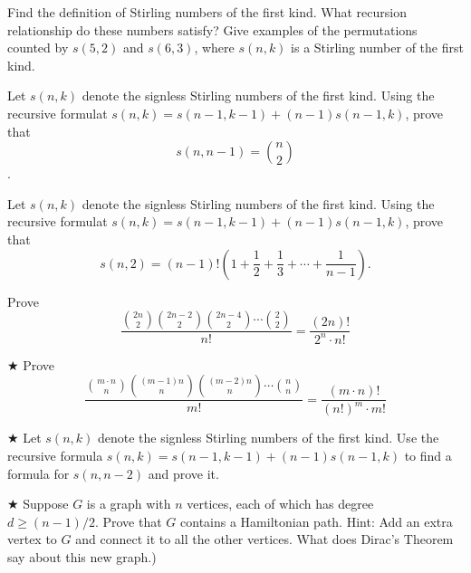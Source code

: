 \begin{exercise}
Find the definition of Stirling numbers of the first kind.  What recursion relationship do these numbers satisfy? Give examples of the permutations counted by $s(5,2)$ and $s(6,3)$, where $s(n,k)$ is a Stirling number of the first kind.
\end{exercise}


\begin{proofp}
Let $s(n,k)$ denote the signless Stirling numbers of the first kind.  Using the recursive formulat $s(n,k)=s(n-1,k-1)+(n-1)s(n-1,k)$, prove that $$s(n,n-1)=\binom{n}{2}$$.
\end{proofp}

\begin{proofp}
Let $s(n,k)$ denote the signless Stirling numbers of the first kind. Using the recursive formulat $s(n,k)=s(n-1,k-1)+(n-1)s(n-1,k)$, prove that $$s(n,2)=(n-1)!\left( 1 + \frac{1}{2} + \frac{1}{3} + \cdots + \frac{1}{n-1} \right).$$
\end{proofp}

\begin{proofp}
Prove $$\frac{\binom{2n}{2}\binom{2n-2}{2}\binom{2n-4}{2}\cdots\binom{2}{2}}{n!}=\frac{(2n)!}{2^n \cdot n!}$$
\end{proofp}

\begin{proofp}$\bigstar$
Prove $$\frac{\binom{m\cdot n}{n}\binom{(m-1)n}{n}\binom{(m-2)n}{n}\cdots\binom{n}{n}}{m!}=\frac{(m\cdot n)!}{(n!)^m \cdot m!}$$
\end{proofp}


\begin{proofp}$\bigstar$
Let $s(n,k)$ denote the signless Stirling numbers of the first kind. Use the recursive formula $s(n,k)=s(n-1,k-1)+(n-1)s(n-1,k)$ to find a formula for $s(n,n-2)$ and prove it.
\end{proofp}

\begin{proofp} $\bigstar$
Suppose $G$ is a graph with $n$ vertices, each of which has degree $d \ge (n-1)/2$.  Prove  that $G$ contains a Hamiltonian path.  Hint: Add an extra vertex to $G$ and connect it to all the other vertices.  What does Dirac's Theorem say about this new graph.)
\end{proofp}

